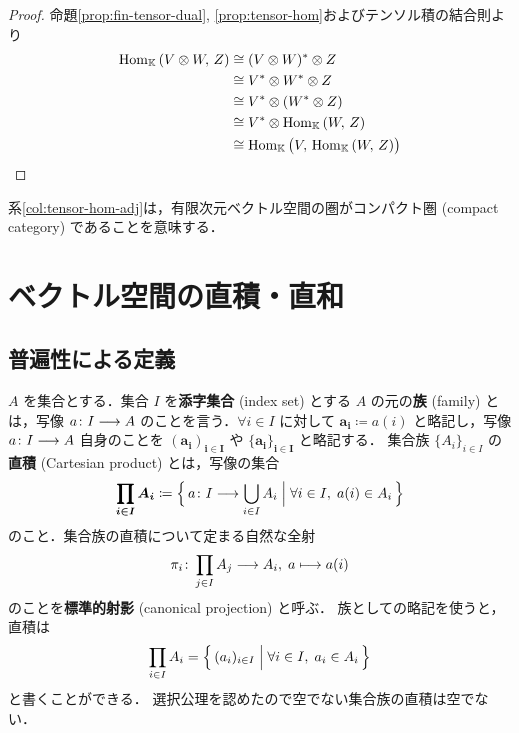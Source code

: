 \documentclass[rep_main]{subfiles}
\begin{document}
\begin{proof}
    命題\ref{prop:fin-tensor-dual}, \ref{prop:tensor-hom}およびテンソル積の結合則より
    \begin{align}
        \mathrm{Hom}_{\mathbb{K}} \mathop{} (V \otimes W,\, Z) 
        &\cong (V \otimes W)^* \otimes Z \\
        &\cong V^* \otimes W^* \otimes Z \\
        &\cong V^* \otimes (W^* \otimes Z) \\
        &\cong V^* \otimes \mathrm{Hom}_{\mathbb{K}} \mathop{} (W,\, Z) \\
        &\cong \mathrm{Hom}_{\mathbb{K}} \mathop{} \bigl( V,\, \mathrm{Hom}_{\mathbb{K}} \mathop{} (W,\, Z) \bigr) 
    \end{align}
\end{proof}

\begin{marker}
    系\ref{col:tensor-hom-adj}は，有限次元ベクトル空間の圏がコンパクト圏 (compact category) であることを意味する．
\end{marker}


\section{ベクトル空間の直積・直和}

\subsection{普遍性による定義}

$A$ を集合とする．集合 $I$ を\textbf{添字集合} (index set) とする $A$ の元の\textbf{族} (family) とは，写像 $a \colon I \longrightarrow A$ のことを言う．$\forall i \in I$ に対して $\bm{a_i} \coloneqq a(i)$ と略記し，写像 $a \colon I \longrightarrow A$ 自身のことを $\bm{(a_i)_{i \in I}}$ や $\bm{\{a_i\}_{i \in I}}$ と略記する．
集合族 $\{A_i\}_{i \in I}$ の\textbf{直積} (Cartesian product) とは，写像の集合
\begin{align}
    \bm{\prod_{i \in I} A_i} \coloneqq \Bigl\{\, a \colon I \longrightarrow \bigcup_{i \in I} A_i \Bigm| \forall i \in I,\; a(i) \in A_i \,\Bigr\} 
\end{align}
のこと．集合族の直積について定まる自然な全射
\begin{align}
    \pi_i \colon \prod_{j \in I} A_j \longrightarrow A_i,\; a \longmapsto a(i)
\end{align}
のことを\textbf{標準的射影} (canonical projection) と呼ぶ．
族としての略記を使うと，直積は
\begin{align}
    \prod_{i \in I} A_i = \Bigl\{\, (a_i)_{i \in I} \Bigm| \forall i \in I,\; a_i \in A_i \,\Bigr\} 
\end{align}
と書くことができる．
選択公理を認めたので空でない集合族の直積は空でない．
\end{document}
